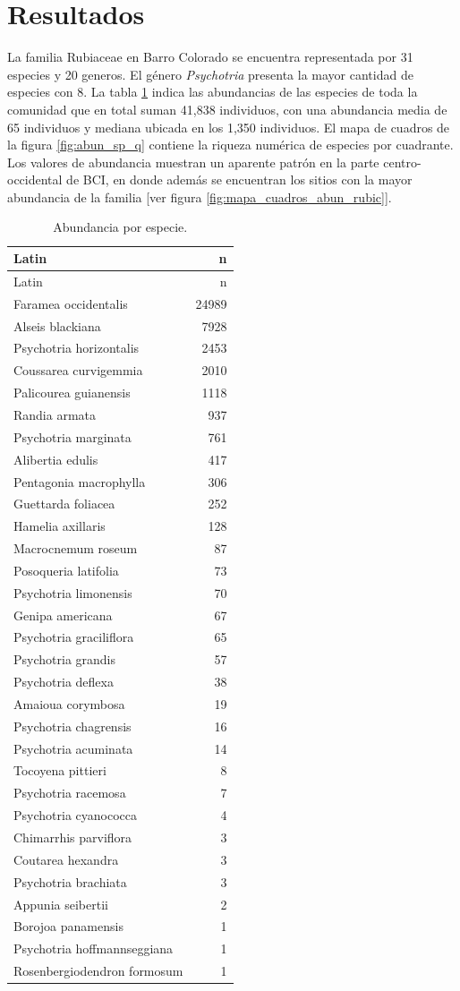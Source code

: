 \documentclass[11pt,]{article}
\begin{document}
\section{Resultados}\label{resultados}

La familia Rubiaceae en Barro Colorado se encuentra representada por 31
especies y 20 generos. El género \emph{Psychotria} presenta la mayor
cantidad de especies con 8. La tabla \ref{tab:abun_sp} indica las
abundancias de las especies de toda la comunidad que en total suman
41,838 individuos, con una abundancia media de 65 individuos y mediana
ubicada en los 1,350 individuos. El mapa de cuadros de la figura
\ref{fig:abun_sp_q} contiene la riqueza numérica de especies por
cuadrante. Los valores de abundancia muestran un aparente patrón en la
parte centro-occidental de BCI, en donde además se encuentran los sitios
con la mayor abundancia de la familia {[}ver figura
\ref{fig:mapa_cuadros_abun_rubic}{]}.

\begin{longtable}[]{@{}lr@{}}
\caption{\label{tab:abun_sp}Abundancia por especie.}\tabularnewline
\toprule
Latin & n\tabularnewline
\midrule
\endfirsthead
\toprule
Latin & n\tabularnewline
\midrule
\endhead
Faramea occidentalis & 24989\tabularnewline
Alseis blackiana & 7928\tabularnewline
Psychotria horizontalis & 2453\tabularnewline
Coussarea curvigemmia & 2010\tabularnewline
Palicourea guianensis & 1118\tabularnewline
Randia armata & 937\tabularnewline
Psychotria marginata & 761\tabularnewline
Alibertia edulis & 417\tabularnewline
Pentagonia macrophylla & 306\tabularnewline
Guettarda foliacea & 252\tabularnewline
Hamelia axillaris & 128\tabularnewline
Macrocnemum roseum & 87\tabularnewline
Posoqueria latifolia & 73\tabularnewline
Psychotria limonensis & 70\tabularnewline
Genipa americana & 67\tabularnewline
Psychotria graciliflora & 65\tabularnewline
Psychotria grandis & 57\tabularnewline
Psychotria deflexa & 38\tabularnewline
Amaioua corymbosa & 19\tabularnewline
Psychotria chagrensis & 16\tabularnewline
Psychotria acuminata & 14\tabularnewline
Tocoyena pittieri & 8\tabularnewline
Psychotria racemosa & 7\tabularnewline
Psychotria cyanococca & 4\tabularnewline
Chimarrhis parviflora & 3\tabularnewline
Coutarea hexandra & 3\tabularnewline
Psychotria brachiata & 3\tabularnewline
Appunia seibertii & 2\tabularnewline
Borojoa panamensis & 1\tabularnewline
Psychotria hoffmannseggiana & 1\tabularnewline
Rosenbergiodendron formosum & 1\tabularnewline
\bottomrule
\end{longtable}
\end{document}
